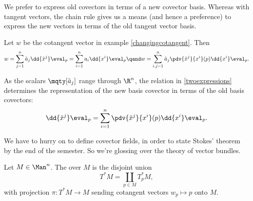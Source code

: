 We prefer to express old covectors in terms of a new covector basis. Whereas with tangent vectors, the chain rule gives us a means (and hence a preference) to express the new vectors in terms of the old tangent vector basis.

\begin{ex}
    Let $w$ be the cotangent vector in example \ref{changingcotangent}. Then 
    \begin{equation}
       \label{twoexpressions}
        w = \sum^{n}_{j=1} \tilde a_j \dd { \fake x j } \eval_p = \sum^{n}_{i=1} a_i \dd { x^i } \eval_p  \qand 
         w = \sum^{n}_{i,j = 1} \tilde a_j \pdv{\fake x j}{x^i} (p) \dd { x^i }\eval_p.
    \end{equation}
    
    As the scalars $\mqty[\tilde a_j]$ range through $\R^n$, the relation in \eqref{twoexpressions} determines the representation of the new basis covector in terms of the old basis covectors:
    \begin{equation}
         \dd { \fake x j } \eval_p = \sum^{n}_{i=1} \pdv{\fake x j}{x^i}(p) \dd { x^i } \eval_p.
    \end{equation}
\end{ex}

\begin{note}[]
    We have to hurry on to define covector fields, in order to state Stokes' theorem by the end of the semester. So we're glossing over the theory of vector bundles.
\end{note}

\begin{defn}
    Let $M \in \Man^n$. The  over $M$ is the disjoint union
   \[
       T^*M = \coprod_{p \in M} T^*_p M,
   \]
   with projection $\pi \colon T^* M \to M$ sending cotangent vectors $w_p \mapsto p$ onto $M$.
\end{defn}


